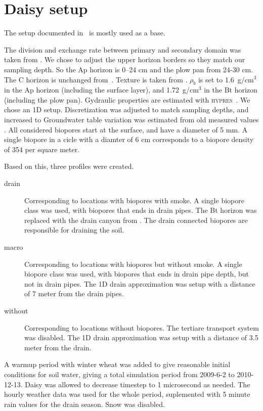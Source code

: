 \documentclass[a4paper]{article}
\begin{document}
\section*{Daisy setup}

The setup documented in~\citet{mst-agrovand} is mostly used as a base.

The division and exchange rate between primary and secondary domain
was taken from \citet{mst-agrovand}.  We chose to adjust the upper
horizon borders so they match our sampling depth.  So the Ap horizon
is 0--24 cm and the plow pan from 24-30 cm.  The C horizon is
unchanged from~\cite{mst-agrovand}.  Texture is taken from
\citet{mst-agrovand}. $\rho_b$ is set to 1.6~g/cm$^3$ in the Ap
horizon (including the surface layer), and 1.72~g/cm$^3$ in the Bt
horizon (including the plow pan).  Gydraulic properties are estimated
with \textsc{hypres}~\citep{hypres}.  We chose an 1D setup.
Discretization was adjusted to match sampling depths, and increased to
Groundwater table variation was estimated from old measured values
\citep{mst-agrovand}.  All considered biopores start at the surface,
and have a diameter of 5 mm.  A single biopore in a cicle with a
diamter of 6 cm corresponds to a biopore density of 354 per square
meter.

Based on this, three profiles were created.
\begin{description}
\item[drain] Corresponding to locations with biopores with smoke.  A
  single biopore class was used, with biopores that ends in drain
  pipes.  The Bt horizon was replaced with the drain canyon from
  \citet{mst-agrovand}.  The drain connected biopores are responsible
  for draining the soil.
\item[macro] Corresponding to locations with biopores but without
  smoke.  A single biopore class was used, with biopores that ends in
  drain pipe depth, but not in drain pipes.  The 1D drain
  approximation was setup with a distance of 7 meter from the drain
  pipes.
\item[without] Corresponding to locations without biopores.  The
  tertiare transport system was disabled.  The 1D drain approximation
  was setup with a distance of 3.5 meter from the drain.
\end{description}

A warmup period with winter wheat was added to give reasonable initial
conditions for soil water, giving a total simulation period from
2009-6-2 to 2010-12-13.  Daisy was allowed to decrease timestep to 1
microsecond as needed.  The hourly weather data was used for the whole
period, suplemented with 5 minute rain values for the drain season.
Snow was disabled.


\end{document}
